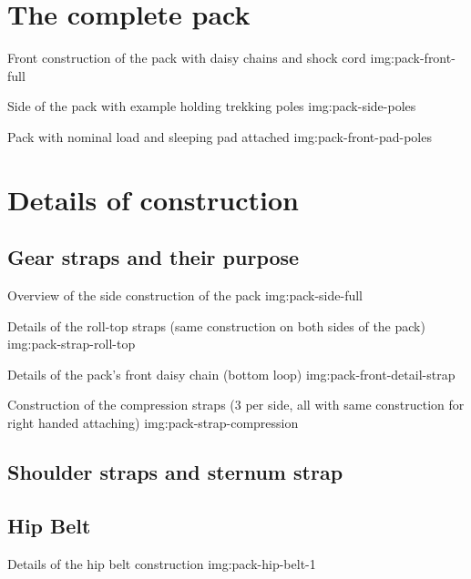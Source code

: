 \section{The complete pack}

{Front construction of the pack with daisy chains and shock cord}
{img:pack-front-full}

{Side of the pack with example holding trekking poles}
{img:pack-side-poles}

{Pack with nominal load and sleeping pad attached}
{img:pack-front-pad-poles}

\section{Details of construction}

\subsection{Gear straps and their purpose}

{Overview of the side construction of the pack}
{img:pack-side-full}

{Details of the roll-top straps (same construction on both sides of the pack)}
{img:pack-strap-roll-top}

{Details of the pack's front daisy chain (bottom loop)}
{img:pack-front-detail-strap}

{Construction of the compression straps (3 per side, all with same construction for right handed attaching)}
{img:pack-strap-compression}

\subsection{Shoulder straps and sternum strap}

\subsection{Hip Belt}

{Details of the hip belt construction}
{img:pack-hip-belt-1}

